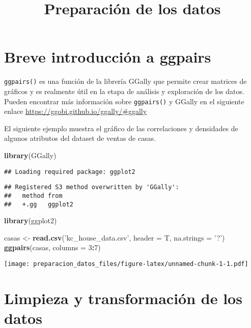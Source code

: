 \documentclass[]{article}
\title{Preparación de los datos}
\author{}
\date{}
\newenvironment{Shaded}{\begin{snugshade}}{\end{snugshade}}
\newcommand{\DataTypeTok}[1]{\textcolor[rgb]{0.13,0.29,0.53}{#1}}
\newcommand{\DecValTok}[1]{\textcolor[rgb]{0.00,0.00,0.81}{#1}}
\newcommand{\KeywordTok}[1]{\textcolor[rgb]{0.13,0.29,0.53}{\textbf{#1}}}
\newcommand{\NormalTok}[1]{#1}
\newcommand{\OperatorTok}[1]{\textcolor[rgb]{0.81,0.36,0.00}{\textbf{#1}}}
\newcommand{\StringTok}[1]{\textcolor[rgb]{0.31,0.60,0.02}{#1}}
\begin{document}
\maketitle

\hypertarget{breve-introduccion-a-ggpairs}{%
\section{Breve introducción a
ggpairs}\label{breve-introduccion-a-ggpairs}}

\texttt{ggpairs()} es una función de la librería GGally que permite
crear matrices de gráficos y es realmente útil en la etapa de análisis y
exploración de los datos. Pueden encontrar más información sobre
\texttt{ggpairs()} y GGally en el siguiente enlace
\url{https://ggobi.github.io/ggally/\#ggally}

El siguiente ejemplo muestra el gráfico de las correlaciones y
densidades de algunos atributos del dataset de ventas de casas.

\begin{Shaded}
\begin{Highlighting}[]
\KeywordTok{library}\NormalTok{(GGally)}
\end{Highlighting}
\end{Shaded}

\begin{verbatim}
## Loading required package: ggplot2
\end{verbatim}

\begin{verbatim}
## Registered S3 method overwritten by 'GGally':
##   method from   
##   +.gg   ggplot2
\end{verbatim}

\begin{Shaded}
\begin{Highlighting}[]
\KeywordTok{library}\NormalTok{(ggplot2)}

\NormalTok{casas <-}\StringTok{ }\KeywordTok{read.csv}\NormalTok{(}\StringTok{'kc_house_data.csv'}\NormalTok{, }\DataTypeTok{header =}\NormalTok{ T, }\DataTypeTok{na.strings =} \StringTok{'?'}\NormalTok{)}
\KeywordTok{ggpairs}\NormalTok{(casas, }\DataTypeTok{columns =} \DecValTok{3}\OperatorTok{:}\DecValTok{7}\NormalTok{)}
\end{Highlighting}
\end{Shaded}

\texttt{[image: preparacion\_datos\_files/figure-latex/unnamed-chunk-1-1.pdf]}

\hypertarget{limpieza-y-transformacion-de-los-datos}{%
\section{Limpieza y transformación de los
datos}\label{limpieza-y-transformacion-de-los-datos}}
\end{document}
